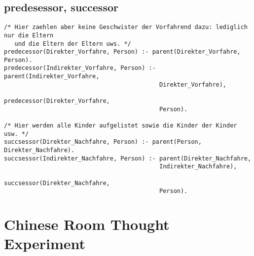 \documentclass{article}
\begin{document}
\subsection{predesessor, successor}

\begin{verbatim}
/* Hier zaehlen aber keine Geschwister der Vorfahrend dazu: lediglich nur die Eltern
   und die Eltern der Eltern uws. */
predecessor(Direkter_Vorfahre, Person) :- parent(Direkter_Vorfahre, Person).
predecessor(Indirekter_Vorfahre, Person) :- parent(Indirekter_Vorfahre,
                                            Direkter_Vorfahre),
                                            predecessor(Direkter_Vorfahre,
                                            Person).

/* Hier werden alle Kinder aufgelistet sowie die Kinder der Kinder usw. */
succsessor(Direkter_Nachfahre, Person) :- parent(Person, Direkter_Nachfahre).
succsessor(Indirekter_Nachfahre, Person) :- parent(Direkter_Nachfahre,
                                            Indirekter_Nachfahre),
                                            succsessor(Direkter_Nachfahre,
                                            Person).
\end{verbatim}

\section{Chinese Room Thought Experiment}
\end{document}
